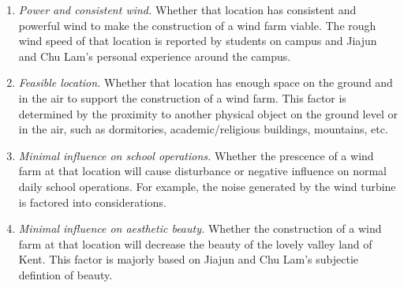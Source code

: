 \documentclass[review]{elsarticle}
\begin{document}
\begin{enumerate}
    \item \emph{Power and consistent wind.} Whether that location has consistent and powerful wind to make the construction of a wind farm viable. The rough wind speed 
    of that location is reported by students on campus and Jiajun and Chu Lam's personal experience around the campus.
    \item \emph{Feasible location.} Whether that location has enough space on the ground and in the air to support the construction of a wind farm. This factor is determined 
    by the proximity to another physical object on the ground level or in the air, such as dormitories, academic/religious buildings, mountains, etc.
    \item \emph{Minimal influence on school operations.} Whether the prescence of a wind farm at that location will cause disturbance or negative influence on normal daily 
    school operations. For example, the noise generated by the wind turbine is factored into considerations.
    \item \emph{Minimal influence on aesthetic beauty.} Whether the construction of a wind farm at that location will decrease the beauty of the lovely valley land of Kent. 
    This factor is majorly based on Jiajun and Chu Lam's subjectie defintion of beauty.
\end{enumerate}
\end{document}
